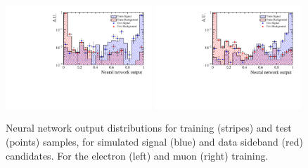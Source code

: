 %
\begin{figure}[b]
\centering
\includegraphics[width=0.49\textwidth]{RKst/figs/Training/EE_wNB_TrainAndTest.pdf}
\includegraphics[width=0.49\textwidth]{RKst/figs/Training/MM_wNB_TrainAndTest.pdf}
\caption{Neural network output distributions for training (stripes) and test (points) samples, for simulated 
signal (blue) and data sideband (red) candidates. For the electron (left) and muon (right) training.}
\label{fig:RKst_nnDist}
\end{figure}
%


